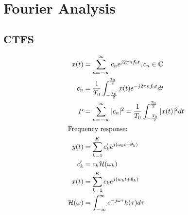 \section{Fourier Analysis}
\subsection{CTFS}
\begin{align*}
    x(t) &= \sum_{n=-\infty}^\infty c_n e^{j2\pi nf_0 t}, c_n\in\mathbb{C}\\
    c_n &= \frac{1}{T_0}\int_{-\frac{T_0}{2}}^{\frac{T_0}{2}} x(t)e^{-j2\pi nf_0 t}dt\\
    P &= \sum_{n=-\infty}^\infty |c_n|^2 = \frac{1}{T_0}\int_{-\frac{T_0}{2}}^{\frac{T_0}{2}} |x(t)|^2 dt\\
    \intertext{Frequency response:}
    y(t) &= \sum_{k=1}^K c'_{k}e^{j(\omega_kt+\theta_k)}\\
    c'_k &= c_k\mathcal{H}(\omega_k)\\
    x(t) &= \sum_{k=1}^Kc_ke^{j(w_kt+\theta_k)}\\
    \mathcal{H}(\omega) &= \int_{-\infty}^\infty e^{-j\omega\tau}h(\tau)d\tau
\end{align*}
